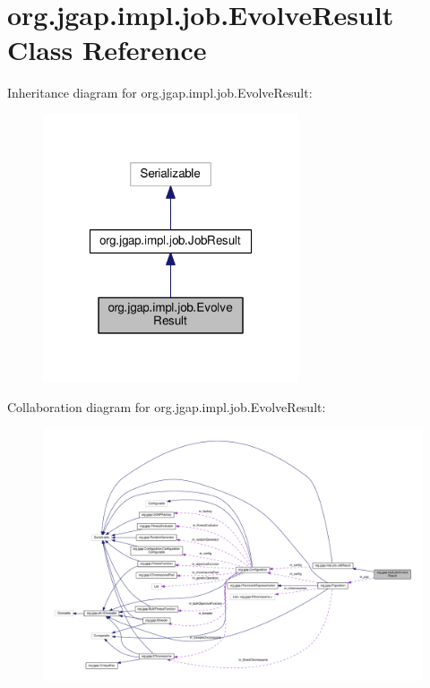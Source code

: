 \hypertarget{classorg_1_1jgap_1_1impl_1_1job_1_1_evolve_result}{\section{org.\-jgap.\-impl.\-job.\-Evolve\-Result Class Reference}
\label{classorg_1_1jgap_1_1impl_1_1job_1_1_evolve_result}
}


Inheritance diagram for org.\-jgap.\-impl.\-job.\-Evolve\-Result\-:
\nopagebreak
\begin{figure}[H]
\begin{center}
\leavevmode
\includegraphics[width=214pt]{classorg_1_1jgap_1_1impl_1_1job_1_1_evolve_result__inherit__graph}
\end{center}
\end{figure}


Collaboration diagram for org.\-jgap.\-impl.\-job.\-Evolve\-Result\-:
\nopagebreak
\begin{figure}[H]
\begin{center}
\leavevmode
\includegraphics[width=350pt]{classorg_1_1jgap_1_1impl_1_1job_1_1_evolve_result__coll__graph}
\end{center}
\end{figure}
